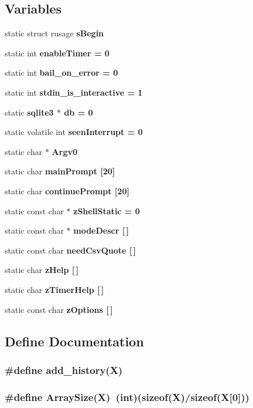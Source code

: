 \subsection*{Variables}
\begin{CompactItemize}
\item 
static struct rusage \bf{s\-Begin}
\item 
static int \bf{enable\-Timer} = 0
\item 
static int \bf{bail\_\-on\_\-error} = 0
\item 
static int \bf{stdin\_\-is\_\-interactive} = 1
\item 
static \bf{sqlite3} $\ast$ \bf{db} = 0
\item 
static volatile int \bf{seen\-Interrupt} = 0
\item 
static char $\ast$ \bf{Argv0}
\item 
static char \bf{main\-Prompt} [20]
\item 
static char \bf{continue\-Prompt} [20]
\item 
static const char $\ast$ \bf{z\-Shell\-Static} = 0
\item 
static const char $\ast$ \bf{mode\-Descr} [$\,$]
\item 
static const char \bf{need\-Csv\-Quote} [$\,$]
\item 
static char \bf{z\-Help} [$\,$]
\item 
static char \bf{z\-Timer\-Help} [$\,$]
\item 
static const char \bf{z\-Options} [$\,$]
\end{CompactItemize}


\subsection{Define Documentation}
\subsubsection{\setlength{\rightskip}{0pt plus 5cm}\#define add\_\-history(X)}\label{3_87_83_2shell_8c_829b1d1666a6724e57520cfcff4beeb3}


\subsubsection{\setlength{\rightskip}{0pt plus 5cm}\#define Array\-Size(X)~(int)(sizeof(X)/sizeof(X[0]))}\label{3_87_83_2shell_8c_390beda80f7cb63d92fdbf9782364a4f}


